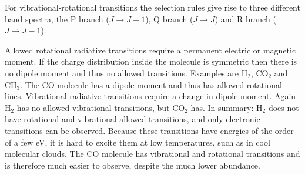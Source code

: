 \documentclass[12pt]{article}
\numberwithin{equation}{section}
\begin{document}
For vibrational-rotational transitions the selection rules give rise to three different band spectra, the P branch ($J \rightarrow J+1$), Q branch ($J \rightarrow J$) and R branch 
($J \rightarrow J-1$).

Allowed rotational radiative transitions require a permanent electric or magnetic moment. If the charge distribution inside the molecule is symmetric then there is no dipole moment and thus no allowed transitions. Examples are H$_2$, CO$_2$ and CH$_3$. The CO molecule has a dipole moment and thus has allowed rotational lines.
Vibrational radiative transitions require a change in dipole moment. Again H$_2$ has no allowed vibrational transitions, but CO$_2$ has. In summary: H$_2$ does not have rotational and vibrational allowed transitions, and only electronic transitions can be observed. Because these transitions have energies of the order of a few eV, it is hard to excite them at low temperatures, such as in cool molecular clouds. The CO molecule has vibrational and rotational transitions and is therefore much easier to observe, despite the much lower abundance.

\clearpage
\end{document}
